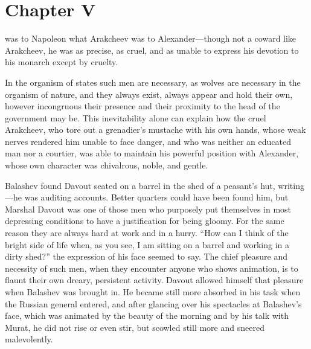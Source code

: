 
\chapter*{Chapter V}
\ifaudio     
{} 
\fi

 was to Napoleon what Arakcheev was to Alexander---though
not a coward like Arakcheev, he was as precise, as cruel, and as
unable to express his devotion to his monarch except by cruelty.

In the organism of states such men are necessary, as wolves are
necessary in the organism of nature, and they always exist,
always appear and hold their own, however incongruous their
presence and their proximity to the head of the government may
be. This inevitability alone can explain how the cruel Arakcheev,
who tore out a grenadier's mustache with his own hands, whose
weak nerves rendered him unable to face danger, and who was
neither an educated man nor a courtier, was able to maintain his
powerful position with Alexander, whose own character was
chivalrous, noble, and gentle.

Balashev found Davout seated on a barrel in the shed of a
peasant's hut, writing---he was auditing accounts. Better
quarters could have been found him, but Marshal Davout was one of
those men who purposely put themselves in most depressing
conditions to have a justification for being gloomy. For the same
reason they are always hard at work and in a hurry. ``How can I
think of the bright side of life when, as you see, I am sitting
on a barrel and working in a dirty shed?'' the expression of his
face seemed to say. The chief pleasure and necessity of such men,
when they encounter anyone who shows animation, is to flaunt
their own dreary, persistent activity. Davout allowed himself
that pleasure when Balashev was brought in. He became still more
absorbed in his task when the Russian general entered, and after
glancing over his spectacles at Balashev's face, which was
animated by the beauty of the morning and by his talk with Murat,
he did not rise or even stir, but scowled still more and sneered
malevolently.

